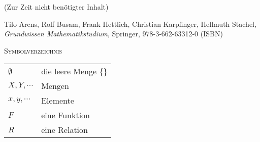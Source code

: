\documentclass[a4paper]{amsart}
\theoremstyle{definition}
\begin{document}
\begin{backup}
    (Zur Zeit nicht benötigter Inhalt)
\end{backup}

\begin{thebibliography}{9}

      Tilo Arens, Rolf Busam, Frank Hettlich, Christian Karpfinger, Hellmuth Stachel, \emph{Grundwissen Mathematikstudium},
      Springer, 978-3-662-63312-0 (ISBN)

\end{thebibliography}

\begin{large}
    \centerline{\textsc{Symbolverzeichnis}}
\end{large}
\bigskip

\renewcommand*{\arraystretch}{1}

\begin{tabular}{ll}
    $\emptyset$             & die leere Menge $\{\}$\\
    $X, Y, \cdots$          & Mengen\\
    $x, y, \cdots$             & Elemente\\
    $F$                 & eine Funktion\\
    $R$             & eine Relation

\end{tabular}
\end{document}
